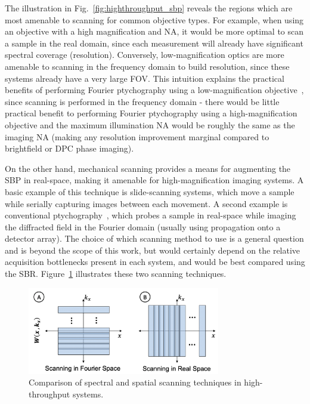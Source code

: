 The illustration in Fig.~\ref{fig:highthroughput_sbp} reveals the regions which are most amenable to scanning for common objective types. For example, when using an objective with a high magnification and NA, it would be more optimal to scan a sample in the real domain, since each measurement will already have significant spectral coverage (resolution). Conversely, low-magnification optics are more amenable to scanning in the frequency domain to build resolution, since these systems already have a very large FOV. This intuition explains the practical benefits of performing Fourier ptychography using a low-magnification objective~\cite{Zheng2013}, since scanning is performed in the frequency domain - there would be little practical benefit to performing Fourier ptychography using a high-magnification objective and the maximum illumination NA would be roughly the same as the imaging NA (making any resolution improvement marginal compared to brightfield or DPC phase imaging).

On the other hand, mechanical scanning provides a means for augmenting the SBP in real-space, making it amenable for high-magnification imaging systems. A basic example of this technique is slide-scanning systems, which move a sample while serially capturing images between each movement. A second example is conventional ptychography~\cite{rodenburg2004phase}, which probes a sample in real-space while imaging the diffracted field in the Fourier domain (usually using propagation onto a detector array). The choice of which scanning method to use is a general question and is beyond the scope of this work, but would certainly depend on the relative acquisition bottlenecks present in each system, and would be best compared using the SBR. Figure~\ref{fig:highthroughput_scanning} illustrates these two scanning techniques.

\begin{figure}
  \centering
    \includegraphics[width=0.75\textwidth]{figures/fig_highthroughput_scanning.png}
  \caption{\label{fig:highthroughput_scanning} Comparison of spectral and spatial scanning techniques in high-throughput systems.}
\end{figure}

